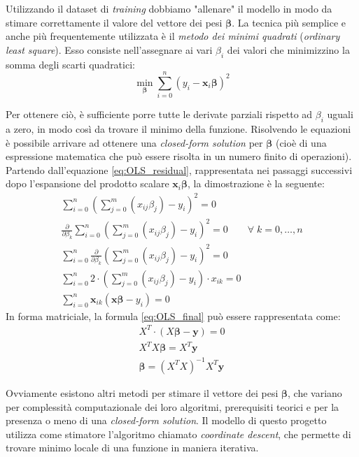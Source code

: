 Utilizzando il dataset di \textit{training} dobbiamo "allenare" il modello in modo da stimare correttamente il valore del 
vettore dei pesi $\bm{\beta}$. La tecnica più semplice e anche più frequentemente utilizzata è il \textit{metodo dei minimi 
quadrati} (\textit{ordinary least square})\cite{dismuke2006ordinary}. Esso consiste nell'assegnare ai vari $\beta_i$ dei valori che minimizzino la 
somma degli scarti quadratici:
\begin{equation}
\min_{\bm{\beta}} \sum_{i=0}^n(y_i - \bm{x}_i\bm{\beta})^2
\label{eq:OLS_residual}
\end{equation}

Per ottenere ciò, è sufficiente porre tutte le derivate parziali rispetto ad $\beta_i$
uguali a zero, in modo così da trovare il minimo della funzione. Risolvendo le equazioni è possibile arrivare ad ottenere una \textit{closed-form solution} per $\bm{\beta}$ 
(cioè di una espressione matematica che può essere risolta in un numero finito di operazioni). Partendo dall'equazione 
\eqref{eq:OLS_residual}, rappresentata nei passaggi successivi dopo l'espansione del prodotto scalare $\bm{x}_i\bm{\beta}$, 
la dimostrazione è la seguente:
\begin{gather}
	\sum_{i=0}^n\left(\sum_{j=0}^m\left(x_{ij}\beta_j\right)-y_i\right)^2 = 0 \qquad  \\
	\frac{\partial}{\partial\beta_k}\sum_{i=0}^n\left(\sum_{j=0}^m\left(x_{ij}\beta_j\right)-y_i\right)^2 = 0	\qquad \forall \; k=0,\ldots,n \label{eq:OLS_minimize} \\
	\sum_{i=0}^n\frac{\partial}{\partial\beta_k}\left(\sum_{j=0}^m\left(x_{ij}\beta_j\right)-y_i\right)^2 = 0\\
	\sum_{i=0}^n 2\cdot \left(\sum_{j=0}^m \left(x_{ij}\beta_j\right)-y_i\right)\cdot x_{ik} = 0 \\
	\sum_{i=0}^n \bm{x}_{ik}\left(\bm{x}\bm{\beta}-y_i\right) =0 \label{eq:OLS_final}
\end{gather}
In forma matriciale, la formula \eqref{eq:OLS_final} può essere rappresentata come:
\begin{gather}
	X^T \cdot \left( X \bm{\beta} - \bm{y} \right) = 0 \\
	X^T X \bm{\beta} = X^T \bm{y}\\
	\bm{\beta} = \left( X^TX\right)^{-1}X^T\bm{y}
\end{gather}	

Ovviamente esistono altri metodi per stimare il vettore dei pesi $\bm{\beta}$, che variano per complessità 
computazionale dei loro algoritmi, prerequisiti teorici e per la presenza o meno di una \textit{closed-form solution}.  
Il modello di questo progetto utilizza come stimatore l'algoritmo chiamato \textit{coordinate descent}, che permette di trovare minimo locale di una funzione in maniera iterativa.
\bigskip

